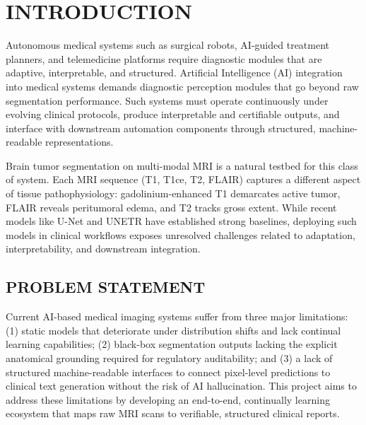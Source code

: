 \documentclass[12pt, a4paper]{report}
\begin{document}
\clearpage
{}

\chapter{INTRODUCTION}
Autonomous medical systems such as surgical robots, AI-guided treatment planners, and telemedicine platforms require diagnostic modules that are adaptive, interpretable, and structured. Artificial Intelligence (AI) integration into medical systems demands diagnostic perception modules that go beyond raw segmentation performance. Such systems must operate continuously under evolving clinical protocols, produce interpretable and certifiable outputs, and interface with downstream automation components through structured, machine-readable representations.

Brain tumor segmentation on multi-modal MRI is a natural testbed for this class of system. Each MRI sequence (T1, T1ce, T2, FLAIR) captures a different aspect of tissue pathophysiology: gadolinium-enhanced T1 demarcates active tumor, FLAIR reveals peritumoral edema, and T2 tracks gross extent. While recent models like U-Net and UNETR have established strong baselines, deploying such models in clinical workflows exposes unresolved challenges related to adaptation, interpretability, and downstream integration.

\section{PROBLEM STATEMENT}
Current AI-based medical imaging systems suffer from three major limitations: (1) static models that deteriorate under distribution shifts and lack continual learning capabilities; (2) black-box segmentation outputs lacking the explicit anatomical grounding required for regulatory auditability; and (3) a lack of structured machine-readable interfaces to connect pixel-level predictions to clinical text generation without the risk of AI hallucination. This project aims to address these limitations by developing an end-to-end, continually learning ecosystem that maps raw MRI scans to verifiable, structured clinical reports.
\end{document}
